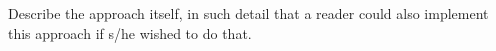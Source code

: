 
Describe the approach itself, in such detail that a reader could also implement this approach if s/he wished to do that.